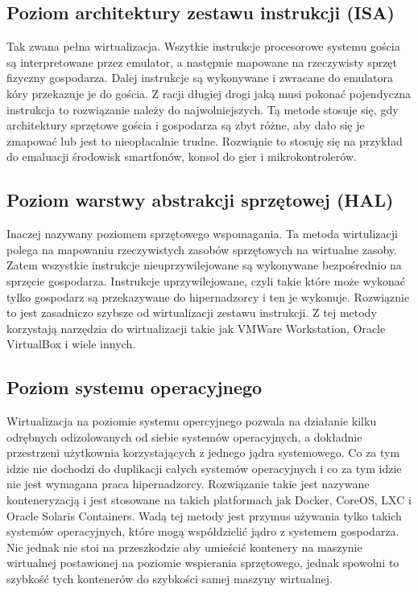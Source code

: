 \documentclass[polish, a4paper, 12pt, oneside]{book}
\begin{document}
\subsection {Poziom architektury zestawu instrukcji (ISA)}
Tak zwana pełna wirtualizacja. Wszytkie instrukcje procesorowe systemu gościa są interpretowane przez emulator, a następnie mapowane na rzeczywisty sprzęt fizyczny gospodarza. Dalej instrukcje są wykonywane i zwracane do emulatora kóry przekazuje je do gościa. Z racji długiej drogi jaką musi pokonać pojendyczna instrukcja to rozwiązanie należy do najwolniejszych. Tą metode stosuje się, gdy architektury sprzętowe gościa i gospodarza są zbyt różne, aby dało się je zmapować lub jest to nieopłacalnie trudne. Rozwiąnie to stosuję się na przykład do emaluacji środowisk smartfonów, konsol do gier i mikrokontrolerów.
\subsection {Poziom warstwy abstrakcji sprzętowej (HAL)}
Inaczej nazywany poziomem sprzętowego wspomagania. Ta metoda wirtulizacji polega na mapowaniu rzeczywistych zasobów sprzętowych na wirtualne zasoby. Zatem wszystkie instrukcje nieuprzywilejowane są wykonywane bezpośrednio na sprzęcie gospodarza. Instrukcje uprzywilejowane, czyli takie które może wykonać tylko gospodarz są przekazywane do hipernadzorcy i ten je wykonuje. Rozwiąznie to jest zasadniczo szybsze od wirtualizacji zestawu instrukcji. Z tej metody korzystają narzędzia do wirtualizacji takie jak VMWare Workstation, Oracle VirtualBox i wiele innych.
\subsection {Poziom systemu operacyjnego}
Wirtualizacja na poziomie systemu opercyjnego pozwala na działanie kilku odrębnych odizolowanych od siebie systemów operacyjnych, a dokładnie przestrzeni użytkownia korzystających z jednego jądra systemowego. Co za tym idzie nie dochodzi do duplikacji całych systemów operacyjnych i co za tym idzie nie jest wymagana praca hipernadzorcy. Rozwiązanie takie jest nazywane konteneryzacją i jest stosowane na takich platformach jak Docker, CoreOS, LXC i Oracle Solaris Containers. Wadą tej metody jest przymus używania tylko takich systemów operacyjnych, które mogą współdzielić jądro z systemem gospodarza. Nic jednak nie stoi na przeszkodzie aby umieścić kontenery na maszynie wirtualnej postawionej na poziomie wspierania sprzętowego, jednak spowolni to szybkość tych kontenerów do szybkości samej maszyny wirtualnej. 
\end{document}
